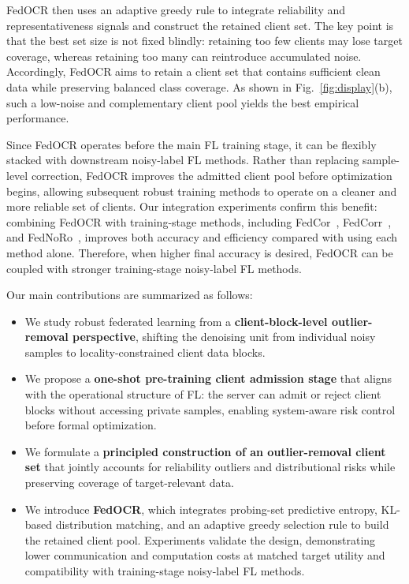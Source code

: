 ﻿\documentclass[conference]{IEEEtran}
\theoremstyle{definition}
\theoremstyle{remark}
\begin{document}
FedOCR then uses an adaptive greedy rule to integrate reliability and representativeness signals and construct the retained client set. The key point is that the best set size is not fixed blindly: retaining too few clients may lose target coverage, whereas retaining too many can reintroduce accumulated noise. Accordingly, FedOCR aims to retain a client set that contains sufficient clean data while preserving balanced class coverage. As shown in Fig.~\ref{fig:display}(b), such a low-noise and complementary client pool yields the best empirical performance.

Since FedOCR operates before the main FL training stage, it can be flexibly stacked with downstream noisy-label FL methods. Rather than replacing sample-level correction, FedOCR improves the admitted client pool before optimization begins, allowing subsequent robust training methods to operate on a cleaner and more reliable set of clients. Our integration experiments confirm this benefit: combining FedOCR with training-stage methods, including FedCor~\cite{tang2022fedcor}, FedCorr~\cite{xu2022fedcorr}, and FedNoRo~\cite{wu2023fednoro}, improves both accuracy and efficiency compared with using each method alone. Therefore, when higher final accuracy is desired, FedOCR can be coupled with stronger training-stage noisy-label FL methods.

Our main contributions are summarized as follows:
\begin{itemize}
	\item We study robust federated learning from a \textbf{client-block-level outlier-removal perspective}, shifting the denoising unit from individual noisy samples to locality-constrained client data blocks.
	
	\item We propose a \textbf{one-shot pre-training client admission stage} that aligns with the operational structure of FL: the server can admit or reject client blocks without accessing private samples, enabling system-aware risk control before formal optimization.
	
	\item We formulate a \textbf{principled construction of an outlier-removal client set} that jointly accounts for reliability outliers and distributional risks while preserving coverage of target-relevant data.
	
	\item We introduce \textbf{FedOCR}, which integrates probing-set predictive entropy, KL-based distribution matching, and an adaptive greedy selection rule to build the retained client pool. Experiments validate the design, demonstrating lower communication and computation costs at matched target utility and compatibility with training-stage noisy-label FL methods.
\end{itemize}
\end{document}
